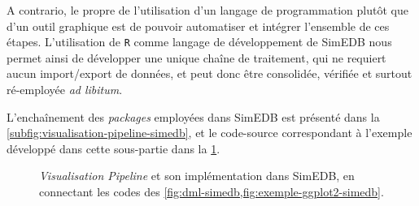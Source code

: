 	A contrario, le propre de l'utilisation d'un langage de programmation plutôt que d'un outil graphique est de pouvoir automatiser et intégrer l'ensemble de ces étapes.
	L'utilisation de \texttt{R} comme langage de développement de SimEDB nous permet ainsi de développer une unique chaîne de traitement, qui ne requiert aucun import/export de données, et peut donc être consolidée, vérifiée et surtout ré-employée \textit{ad libitum}.
	
	L'enchaînement des \textit{packages} employées dans SimEDB est présenté dans la \cref{subfig:visualisation-pipeline-simedb}, et le code-source correspondant à l'exemple développé dans cette sous-partie dans la \cref{fig:visualisation-pipeline-exemple}.

			\begin{figure}[H]
				\centering
				\hspace{5pt}
				\hspace{5pt}
				\hspace{5pt}
			\caption{\og \textit{Visualisation Pipeline}\fg{} et son implémentation dans SimEDB, en \og connectant\fg{} les codes des \cref{fig:dml-simedb,fig:exemple-ggplot2-simedb}.}
				\label{fig:visualisation-pipeline-exemple}
			\end{figure}

